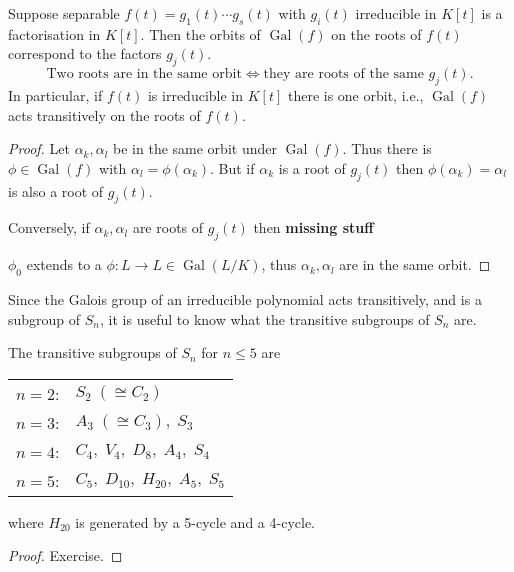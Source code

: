 \documentclass{article}
\DeclareMathOperator{\Gal}{Gal}
\begin{document}
\begin{nlemma}\label{lem:3.6}
    Suppose separable $f(t) = g_1(t) \dotsm g_s(t)$ with $g_i(t)$ irreducible in $K[t]$ is a factorisation in $K[t]$.
    Then the orbits of $\Gal(f)$ on the roots of $f(t)$ correspond to the factors $g_j(t)$.
    \begin{equation*}
        \text{Two roots are in the same orbit} \iff \text{they are roots of the same } g_j(t).
    \end{equation*}
    In particular, if $f(t)$ is irreducible in $K[t]$ there is one orbit, i.e., $\Gal(f)$ acts transitively on the roots of $f(t)$.
\end{nlemma}
\begin{proof}
    Let $\alpha_k, \alpha_l$ be in the same orbit under $\Gal(f)$.
    Thus there is $\phi \in \Gal(f)$ with $\alpha_l = \phi(\alpha_k)$.
    But if $\alpha_k$ is a root of $g_j(t)$ then $\phi(\alpha_k) = \alpha_l$ is also a root of $g_j(t)$.

    Conversely, if $\alpha_k, \alpha_l$ are roots of $g_j(t)$ then
    \textbf{missing stuff}

    $\phi_0$ extends to a $\phi:L \to L \in \Gal(L/K)$, thus $\alpha_k, \alpha_l$ are in the same orbit.
\end{proof}

Since the Galois group of an irreducible polynomial acts transitively, and is a subgroup of $S_n$, it is useful to know what the transitive subgroups of $S_n$ are.

\begin{nlemma}\label{lem:3.7}
    The transitive subgroups of $S_n$ for $n \leq 5$ are
    \begin{center}
        \begin{tabular}{rl}
            $n=2$:  & $S_2 \; (\cong C_2)$ \\
            $n=3$:  & $A_3 \; (\cong C_3), \; S_3$ \\
            $n=4$:  & $C_4, \; V_4, \; D_8, \; A_4, \; S_4$ \\
            $n=5$:  & $C_5, \; D_{10}, \; H_{20}, \; A_5, \; S_5$\\
        \end{tabular}
    \end{center}
    where $H_{20}$ is generated by a 5-cycle and a 4-cycle.
\end{nlemma}

\begin{proof}
    Exercise.
\end{proof}
\end{document}
